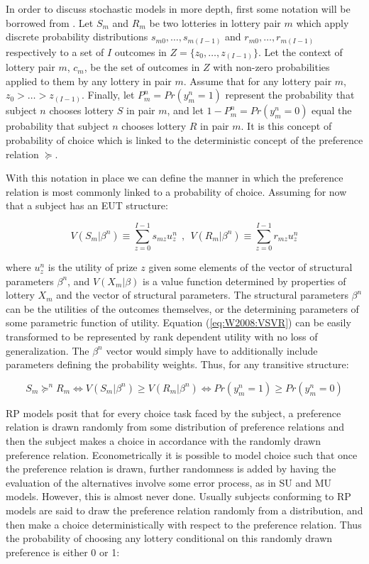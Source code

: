 \documentclass[11pt,a4paper]{report}
\newcommand\Prob{\ensuremath{\mathit{Pr}}}  %
\begin{document}
In order to discuss stochastic models in more depth, first some notation will be borrowed from \textcite{Wilcox2008}.
Let $S_m$ and $R_m$ be two lotteries in lottery pair $m$ which apply discrete probability distributions $s_{m0} , \ldots , s_{m(I-1)}$ and $r_{m0} , \ldots , r_{m(I-1)}$ respectively to a set of $I$ outcomes in $Z = \lbrace z_0 , \ldots , z_{(I-1)} \rbrace$.
Let the context of lottery pair $m$, $c_m$, be the set of outcomes in $Z$ with non-zero probabilities applied to them by any lottery in pair $m$.
Assume that for any lottery pair $m$, $z_0 > \ldots > z_{(I-1)}$.
Finally, let $P_m^n = {\Prob}(y_m^n = 1) $ represent the probability that subject $n$ chooses lottery $S$ in pair $m$, and let $1-P_m^n = {\Prob}(y_m^n = 0)$ equal the probability that subject $n$ chooses lottery $R$ in pair $m$.
It is this concept of probability of choice which is linked to the deterministic concept of the preference relation $\succeq$.

With this notation in place we can define the manner in which the preference relation  is most commonly linked to a probability of choice.
Assuming for now that a subject has an EUT structure: 

\begin{equation}
	\label{eq:W2008:VSVR}
	V( S_m | \beta^n )  \equiv \sum_{z=0}^{I-1} s_{mz} u^n_z   ~~,~~  V( R_m | \beta^n ) \equiv \sum_{z=0}^{I-1} r_{mz} u^n_z
\end{equation}

\noindent where $u_z^n$ is the utility of prize $z$ given some elements of the vector of structural parameters $\beta^n$, and $V(X_m|\beta)$ is a value function determined by properties of lottery $X_m$ and the vector of structural parameters.
The structural parameters $\beta^n$ can be the utilities of the outcomes themselves, or the determining parameters of some parametric function of utility.
Equation (\ref{eq:W2008:VSVR}) can be easily transformed to be represented by rank dependent utility with no loss of generalization.
The $\beta^n$ vector would simply have to additionally include parameters defining the probability weights.
Thus, for any transitive structure:

\begin{equation}
	S_m \succeq^n R_m \Leftrightarrow  V( S_m | \beta^n ) \geq V( R_m | \beta^n ) \Leftrightarrow {\Prob}( y^n_m=1 ) \geq {\Prob}( y^n_m=0 )
\end{equation}

RP models posit that for every choice task faced by the subject, a preference relation is drawn randomly from some distribution of preference relations and then the subject makes a choice in accordance with the randomly drawn preference relation.
Econometrically it is possible to model choice such that once the preference relation is drawn, further randomness is added by having the evaluation of the alternatives involve some error process, as in SU and MU models.
However, this is almost never done.
Usually subjects conforming to RP models are said to draw the preference relation randomly from a distribution, and then make a choice deterministically with respect to the preference relation.
Thus the probability of choosing any lottery conditional on this randomly drawn preference is either 0 or 1:
\end{document}
